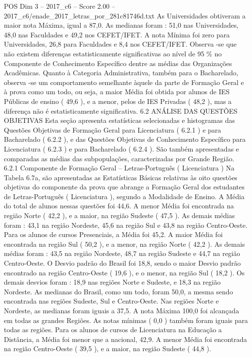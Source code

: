 \begin{textsample}{POS Dim 3 – 2017\_c6 – Score 2.00 – 2017\_c6/enade\_2017\_letras\_por\_281c81746d.txt}
As Universidades obtiveram a maior nota Máxima, igual a 87,0.
As medianas foram : 51,0 nas Universidades, 48,0 nas Faculdades e 49,2 nos CEFET/IFET.
A nota Mínima foi zero para Universidades, 26,8 para Faculdades e 8,4 nos CEFET/IFET.
Observa -se que não existem diferenças estatisticamente significativas ao nível de 95 \% no Componente de Conhecimento Específico dentre as médias das Organizações Acadêmicas.
Quanto à Categoria Administrativa, também para o Bacharelado, observa -se um comportamento semelhante àquele da parte de Formação Geral e à prova como um todo, ou seja, a maior Média foi obtida por alunos de IES Públicas de ensino ( 49,6 ), e a menor, pelos de IES Privadas ( 48,2 ), mas a diferença não é estatisticamente significativa. 6.2 ANÁLISE DAS QUESTÕES OBJETIVAS Esta seção apresenta estatísticas selecionadas e histogramas das Questões Objetivas de Formação Geral para Licenciatura ( 6.2.1 ) e para Bacharelado ( 6.2.2 ), e das Questões Objetivas de Conhecimento Específico para Licenciatura ( 6.2.3 ) e para Bacharelado ( 6.2.4 ).
São também apresentadas e comparadas as médias das subpopulações, caracterizadas por Grande Região. 6.2.1 Componente de Formação Geral – Letras-Português ( Licenciatura ) Na Tabela 6.7a, são apresentadas as Estatísticas Básicas relativas às oito questões objetivas do componente da prova que abrange a Formação Geral dos estudantes de Letras-Português ( Licenciatura ), segundo a Modalidade de Ensino.
A Média do total de alunos nessas questões foi 44,6.
A menor Média foi encontrada na região Norte ( 42,2 ), e a maior, na região Sudeste ( 47,5 ).
As demais médias foram : 43,1 na região Nordeste, 45,6 na região Sul e 43,8 na região Centro-Oeste.
Para os alunos de cursos Presenciais, a Média foi 45,2.
A maior Média foi encontrada na região Sul ( 50,2 ), e a menor, na região Norte ( 42,2 ).
As demais médias foram : 43,5 na região Nordeste, 48,7 na região Sudeste e 44,7 na região Centro-Oeste.
O Desvio padrão do Brasil foi 18,8, sendo o maior Desvio padrão encontrado na região Centro-Oeste ( 19,6 ), e o menor, na região Sul ( 18,2 ).
Os demais desvios foram : 18,9 nas regiões Norte e Sudeste, e 18,3 na região Nordeste.
As medianas do Brasil, como um todo, foram 50,0, a mesma sendo encontrada nas regiões Sudeste, Sul e Centro-Oeste.
Nas regiões Norte e Nordeste, as medianas foram iguais a 37,5.
A nota Máxima 100,0 foi alcançada em todas as grandes Regiões.
As notas mínimas ( 0,0 ) também foram iguais para todas as regiões.
Para os alunos de cursos de Licenciatura na Educação a Distância, a Média foi menor que a nacional, 42,9.
A menor Média foi encontrada na região Centro-Oeste ( 39,5 ), e a maior, na região Sudeste ( 44,8 ).

\end{textsample}
